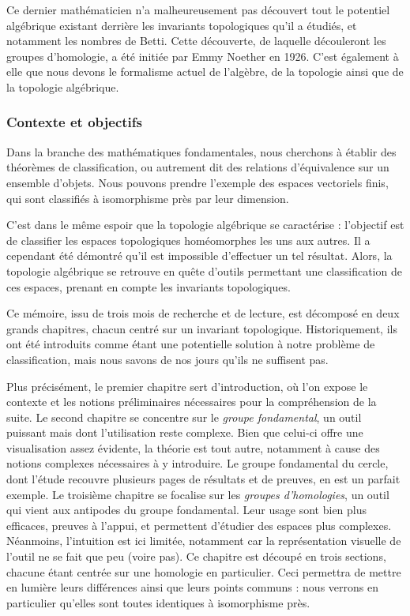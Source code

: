 Ce dernier mathématicien n’a malheureusement pas découvert tout le potentiel algébrique existant derrière les invariants topologiques qu’il a étudiés, et notamment les nombres de Betti. Cette découverte, de laquelle découleront les groupes d’homologie, a été initiée par Emmy Noether en 1926. C’est également à elle que nous devons le formalisme actuel de l’algèbre, de la topologie ainsi que de la topologie algébrique.

\subsubsection{Contexte et objectifs}

Dans la branche des mathématiques fondamentales, nous cherchons à établir des théorèmes de classification, ou autrement dit des relations d’équivalence sur un ensemble d’objets. Nous pouvons prendre l’exemple des espaces vectoriels finis, qui sont classifiés à isomorphisme près par leur dimension.

C’est dans le même espoir que la topologie algébrique se caractérise : l’objectif est de classifier les espaces topologiques homéomorphes les uns aux autres. Il a cependant été démontré \cite{homeoImpossible} qu’il est impossible d’effectuer un tel résultat. Alors, la topologie algébrique se retrouve en quête d’outils permettant une classification de ces espaces, prenant en compte les invariants topologiques.

\bigskip Ce mémoire, issu de trois mois de recherche et de lecture, est décomposé en deux grands chapitres, chacun centré sur un invariant topologique. Historiquement, ils ont été introduits comme étant une potentielle solution à notre problème de classification, mais nous savons de nos jours qu'ils ne suffisent pas.

Plus précisément, le premier chapitre sert d'introduction, où l'on expose le contexte et les notions préliminaires nécessaires pour la compréhension de la suite. Le second chapitre se concentre sur le \emph{groupe fondamental}, un outil puissant mais dont l'utilisation reste complexe. Bien que celui-ci offre une visualisation assez évidente, la théorie est tout autre, notamment à cause des notions complexes nécessaires à y introduire. Le groupe fondamental du cercle, dont l'étude recouvre plusieurs pages de résultats et de preuves, en est un parfait exemple. Le troisième chapitre se focalise sur les \emph{groupes d'homologies}, un outil qui vient aux antipodes du groupe fondamental. Leur usage sont bien plus efficaces, preuves à l'appui, et permettent d'étudier des espaces plus complexes. Néanmoins, l'intuition est ici limitée, notamment car la représentation visuelle de l'outil ne se fait que peu (voire pas). Ce chapitre est découpé en trois sections, chacune étant centrée sur une homologie en particulier. Ceci permettra de mettre en lumière leurs différences ainsi que leurs points communs : nous verrons en particulier qu'elles sont toutes identiques à isomorphisme près.

